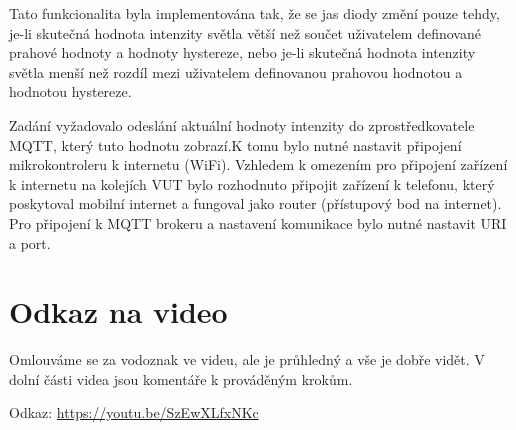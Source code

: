 \documentclass[a4paper, 11pt]{article}
\begin{document}
Tato funkcionalita byla implementována tak, že se jas diody změní pouze tehdy, je-li skutečná hodnota intenzity světla větší než součet uživatelem definované prahové hodnoty a hodnoty hystereze, nebo je-li skutečná hodnota intenzity světla menší než rozdíl mezi uživatelem definovanou prahovou hodnotou a hodnotou hystereze.

Zadání vyžadovalo odeslání aktuální hodnoty intenzity do zprostředkovatele MQTT, který tuto hodnotu zobrazí.K tomu bylo nutné nastavit připojení mikrokontroleru k internetu (WiFi). Vzhledem k omezením pro připojení zařízení k internetu na kolejích VUT bylo rozhodnuto připojit zařízení k telefonu, který poskytoval mobilní internet a fungoval jako router (přístupový bod na internet). 
Pro připojení k MQTT brokeru a nastavení komunikace bylo nutné nastavit URI a port.

\section{Odkaz na video}
Omlouváme se za vodoznak ve videu, ale je průhledný a vše je dobře vidět. V dolní části videa jsou komentáře k prováděným krokům.

Odkaz: \href{https://youtu.be/SzEwXLfxNKc}{https://youtu.be/SzEwXLfxNKc}
\printbibliography 
\end{document}
